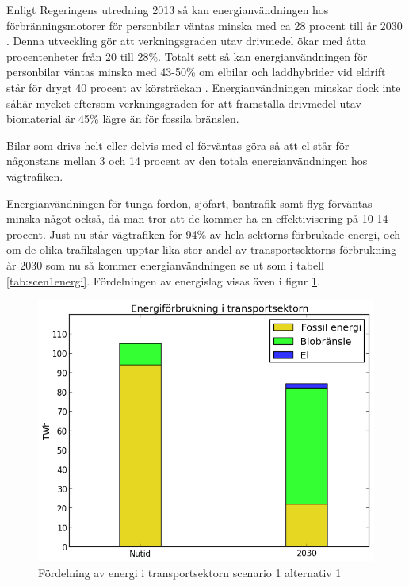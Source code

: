 \documentclass[a4paper,11pt,fleqn, titlepage]{article}
\begin{document}
Enligt Regeringens utredning 2013 så kan energianvändningen hos
förbränningsmotorer för personbilar väntas minska med ca 28 procent till år
2030 \cite{fossilfrihet}. Denna utveckling gör att verkningsgraden utav
drivmedel ökar med åtta procentenheter från 20 till 28\%.  Totalt sett så
kan energianvändningen för personbilar väntas minska med 43-50\% om elbilar
och laddhybrider vid eldrift står för drygt 40 procent av körsträckan
\cite{fossilfrihet}.  Energianvändningen minskar dock inte såhär mycket
eftersom verkningsgraden för att framställa drivmedel utav biomaterial
är 45\% lägre än för fossila bränslen.

Bilar som drivs helt eller delvis med el förväntas göra så att el står för
någonstans mellan 3 och 14 procent av den totala energianvändningen hos
vägtrafiken.

Energianvändningen för tunga fordon, sjöfart, bantrafik samt flyg förväntas
minska något också, då man tror att de kommer ha en effektivisering på 10-14 procent.
Just nu står vägtrafiken för 94\% av hela sektorns förbrukade energi\cite[s.~11]{el2013}, och
om de olika trafikslagen upptar lika stor andel av transportsektorns
förbrukning år 2030 som nu så kommer energianvändningen se ut som i tabell
\ref{tab:scen1energi}. Fördelningen av energislag visas även i figur \ref{fig:scen1energifordelning}.

\begin{figure}[h!]
       \centering
       \includegraphics[scale=0.7]{scen1a1transport.png}
       \caption{Fördelning av energi i transportsektorn scenario 1 alternativ 1}
       \label{fig:scen1energifordelning}
\end{figure}
\end{document}
